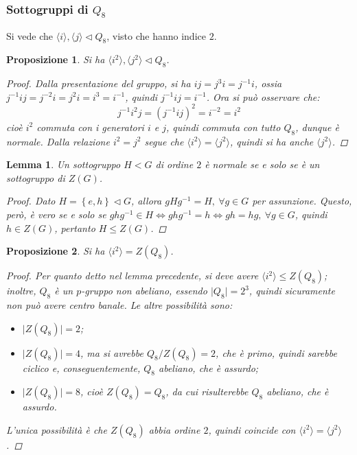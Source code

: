 \documentclass[12pt]{scrartcl}
\theoremstyle{style}
\newtheorem{prop}{Proposizione}[section]
\newtheorem{lemma}{Lemma}[teorema]
\numberwithin{equation}{subsection}
\begin{document}
\subsubsection{Sottogruppi di $Q_8$}
Si vede che $\langle i \rangle, \langle j \rangle\lhd Q_8$, visto che hanno indice $2$.
\begin{prop}
	
Si ha $\langle i^2 \rangle,\langle j^2 \rangle \lhd Q_8$.
\begin{proof}
Dalla presentazione del gruppo, si ha $ij=j^3i=j^{-1}i$, ossia $j^{-1}ij=j^{-2}i = j^2 i = i^3=i^{-1}$, quindi $j^{-1}ij = i^{-1}$.
Ora si pu\`o osservare che:
\[
j^{-1}i^2 j = (j^{-1}ij)^2 = i^{-2}=i^2
\] 
cio\`e $i^2$ commuta con i generatori $i$ e $j$, quindi commuta con tutto $Q_8$, dunque \`e normale.
Dalla relazione $i^2 = j^2$ segue che $\langle i^2 \rangle=\langle j^2 \rangle$, quindi si ha anche $\langle j^2 \rangle$.
\end{proof}
\end{prop}
\begin{lemma}
	Un sottogruppo $H<G$ di ordine $2$ \`e normale se e solo se \`e un sottogruppo di $Z(G)$.
	\begin{proof}
		Dato $H = \left\{ e , h \right\} \lhd G$, allora $g H g^{-1}= H , \ \forall g \in G$ per assunzione. 
		Questo, per\`o, \`e vero se e solo se $ghg^{-1}\in H \iff ghg^{-1}=h \iff gh=hg, \ \forall g \in G$, quindi $h \in Z(G)$, pertanto $H \le  Z(G)$.
	\end{proof}
\end{lemma}
\begin{prop}
	Si ha $\langle i^2 \rangle = Z(Q_8)$.
	\begin{proof}
		Per quanto detto nel lemma precedente, si deve avere $\langle i^2 \rangle \le Z(Q_8)$; inoltre, $Q_8$ \`e un $p$-gruppo non abeliano, essendo $\lvert Q_8 \rvert =2^3$, quindi sicuramente non pu\`o avere centro banale.
		Le altre possibilit\`a sono:
		\begin{itemize}
			\item $\lvert Z(Q_8) \rvert = 2$;
			\item $\lvert Z(Q_8) \rvert = 4$, ma si avrebbe $Q_8 / Z(Q_8) = 2$, che \`e primo, quindi sarebbe ciclico e, conseguentemente, $Q_8$ abeliano, che \`e assurdo;
			\item $\lvert Z(Q_8) \rvert = 8$, cio\`e $Z(Q_8) = Q_8$, da cui risulterebbe $Q_8$ abeliano, che \`e assurdo.
		\end{itemize}
		L'unica possibilit\`a \`e che $Z(Q_8)$ abbia ordine $2$, quindi coincide con $\langle i ^2\rangle = \langle j^2 \rangle$.
	\end{proof}
\end{prop}
\end{document}
